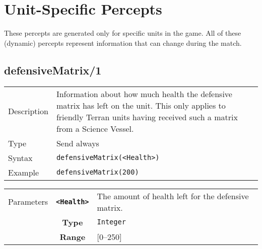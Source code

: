 \newpage

\section{Unit-Specific Percepts}
These percepts are generated only for specific units in the game. All of these (dynamic) percepts represent information that can change during the match.

\subsection{defensiveMatrix/1}
\begin{tabularx}{\textwidth}{lX}
 Description & Information about how much health the defensive matrix has left on the unit. This only applies to friendly Terran units having received such a matrix from a Science Vessel. \\
 Type & Send always \\
 Syntax & \verb|defensiveMatrix(<Health>)| \\
 Example & \verb|defensiveMatrix(200)|   \\
 \end{tabularx}
 \begin{tabularx}{\textwidth}{l | c | p{8cm}|}
 \cline{2-3}
 Parameters & \textbf{\verb|<Health>|} & The amount of health left for the defensive matrix.\\
            & \textbf{Type} & \verb|Integer| \\
            & \textbf{Range} & [0--250] \\
            \cline{2-3}
\end{tabularx}

